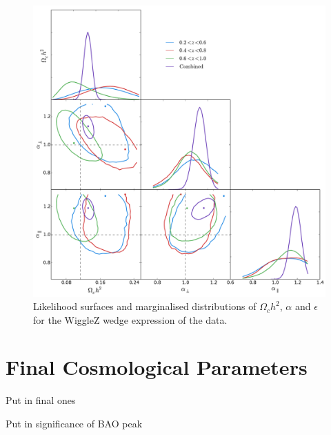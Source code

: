 \documentclass[titlesmallcaps, examinerscopy, copyrightpage]{uqthesis}
\begin{document}
\begin{figure}[h!]
  \begin{center}
    \includegraphics[width=\textwidth]{images/corCombinedWedge.pdf}
  \end{center}
  \caption{Likelihood surfaces and marginalised distributions of $\Omega_ch^2$, $\alpha$ and $\epsilon$ for the WiggleZ wedge expression of the data. }
  \label{fig:wigglezBinsWdg}
\end{figure}




\newpage\phantom{blabla}\newpage
\section{Final Cosmological Parameters}

Put in final ones

Put in significance of BAO peak
\end{document}
